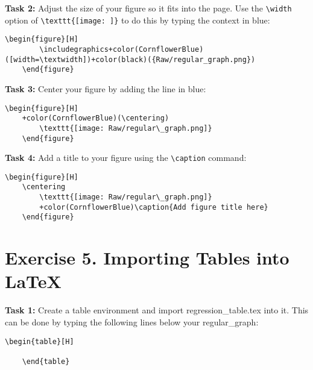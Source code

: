 \documentclass[12pts]{report}
\begin{document}
\textbf{Task 2:} Adjust the size of your figure so it fits into the page. Use the \verb|\width| option of \verb|\texttt{[image: ]}| to do this by typing the context in blue:
\begin{center}
	\begin{Verbatim}[commandchars=+\(\)]
	\begin{figure}[H]
		\includegraphics+color(CornflowerBlue)([width=\textwidth])+color(black)({Raw/regular_graph.png})
	\end{figure}
	\end{Verbatim}
\end{center}


\textbf{Task 3:} Center your figure by adding the line in blue:
\begin{center}
	\begin{Verbatim}[commandchars=+\(\)]
	\begin{figure}[H]
	+color(CornflowerBlue)(\centering)
		\texttt{[image: Raw/regular\_graph.png]}
	\end{figure}
	\end{Verbatim}
\end{center}

\textbf{Task 4:} Add a title to your figure using the \verb|\caption| command:
\begin{center}
	\begin{Verbatim}[commandchars=+\(\)]
	\begin{figure}[H]
	\centering
		\texttt{[image: Raw/regular\_graph.png]}
		+color(CornflowerBlue)\caption{Add figure title here}
	\end{figure}
	\end{Verbatim}
\end{center}

\section*{Exercise 5. Importing Tables into \LaTeX}
\textbf{Task 1:} Create a table environment and import regression\_table.tex into it. This can be done by typing the following lines below your regular\_graph:
\begin{center}
	\begin{Verbatim}[commandchars=+\(\)]
	\begin{table}[H]
		
	\end{table}
	\end{Verbatim}
\end{center}
\end{document}
